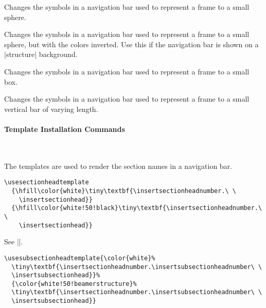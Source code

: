 \begin{command}{\beamertemplatesphereminiframe}
  Changes the symbols in a navigation bar used to represent
  a frame to a small sphere.
\end{command}

\begin{command}{\beamertemplatesphereminiframeinverted}
  Changes the symbols in a navigation bar used to represent
  a frame to a small sphere, but with the colors inverted. Use this if
  the navigation bar is shown on a |structure| background.
\end{command}

\begin{command}{\beamertemplateboxminiframe}
  Changes the symbols in a navigation bar used to represent
  a frame to a small box.
\end{command}

\begin{command}{\beamertemplateticksminiframe}
  Changes the symbols in a navigation bar used to represent
  a frame to a small vertical bar of varying length.
\end{command}


\paragraph{Template Installation Commands}\ 

\begin{command}{\usesectionheadtemplate{}}
  The templates are used to render the section names in a navigation
  bar. 
  \example
\begin{verbatim}
\usesectionheadtemplate
  {\hfill\color{white}\tiny\textbf{\insertsectionheadnumber.\ \
    \insertsectionhead}}
  {\hfill\color{white!50!black}\tiny\textbf{\insertsectionheadnumber.\ \ 
    \insertsectionhead}}
\end{verbatim}
\end{command}
  

\begin{command}{\usesubsectionheadtemplate{}}
  See |\usesectionheadtemplate|.
  \example
\begin{verbatim}
\usesubsectionheadtemplate{\color{white}%
  \tiny\textbf{\insertsectionheadnumber.\insertsubsectionheadnumber\ \
  \insertsubsectionhead}}%
  {\color{white!50!beamerstructure}%
  \tiny\textbf{\insertsectionheadnumber.\insertsubsectionheadnumber\ \ 
  \insertsubsectionhead}}
\end{verbatim}
\end{command}

